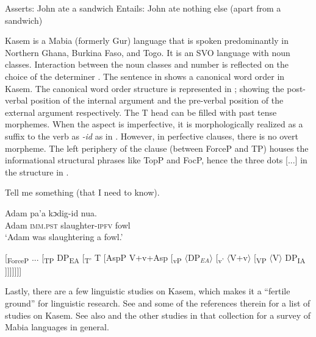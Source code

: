 \documentclass[output=paper,colorlinks,citecolor=brown,draftmode
]{langscibook}
\begin{document}
\ea \label{ex:Aremu:English AwF: Assertion and truth-cond} 

\begin{xlist}

\ex Asserts: John ate a sandwich \label{ex:Aremu:English OF Assertion}
\ex Entails: John ate nothing else (apart from a sandwich) \label{ex:Aremu:English OF truth-condition}

\end{xlist} 
\z


Kasem is a Mabia (formerly Gur) language that is spoken predominantly in Northern Ghana, Burkina Faso, and Togo. It is an SVO language with noun classes. Interaction between the noun classes and number is reflected on the choice of the determiner \citep[see][]{awedoba1996kasem}. The sentence in  shows a canonical word order in Kasem. The canonical word order structure is represented in ; showing the post-verbal position of the internal argument and the pre-verbal position of the external argument respectively. The T head can be filled with past tense morphemes. When the aspect is imperfective, it is morphologically realized as a suffix to the verb as \textit{-id} as in . However, in perfective clauses, there is no overt morpheme. The left periphery of the clause (between ForceP and TP) houses the informational structural phrases like TopP and FocP, hence the three dots [...] in the structure in .

\ea \label{ex:Aremu:Kusaal: SVO}
\begin{xlist}

\ex Tell me something (that I need to know).

\ex \label{ex:Aremu:Canonical word order}
\gll Adam pa'a kɔdig-id nua.\\
 Adam \textsc{imm.pst} slaughter-\textsc{ipfv} fowl\\
\glt `Adam was slaughtering a fowl.'	

\end{xlist}
\z

\ea \label{ex:Aremu:Word order structure}
 [\textsubscript{ForceP} ... [\textsubscript{TP} DP\textsubscript{EA} [\textsubscript{T'} T [AspP V+v+Asp [\textsubscript{vP} $\langle$DP$_{EA}\rangle$ [\textsubscript{v'} $\langle$V+v$\rangle$ [\textsubscript{VP} $\langle$V$\rangle$ DP\textsubscript{IA} ]]]]]]]
\z


Lastly, there are a few linguistic studies on Kasem, which makes it a ``fertile ground'' for linguistic research. See \citet{awedoba1996kasem} and some of the references therein for a list of studies on Kasem. See also \citet{bodomo2020mabia} and the other studies in that collection for a survey of Mabia languages in general.
\end{document}
